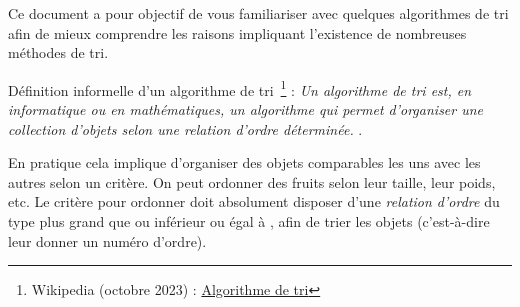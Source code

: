 \documentclass[11pt,a4paper]{article}
\begin{document}
\EncadreTitre

\bigskip


%
%

\bigskip


Ce document a pour objectif de vous familiariser avec quelques algorithmes de tri afin de mieux comprendre les raisons impliquant l'existence de nombreuses méthodes de tri.

\bigskip

Définition informelle d'un algorithme de tri~\footnote{Wikipedia (octobre 2023) : \href{https://fr.wikipedia.org/wiki/Algorithme_de_tri}{Algorithme de tri}} : \og \textit{Un algorithme de tri est, en informatique ou en mathématiques, un algorithme qui permet d'organiser une collection d'objets selon une relation d'ordre déterminée.} \fg .

\bigskip

En pratique cela implique d'organiser des objets comparables les uns avec les autres selon un critère.
On peut ordonner des fruits selon leur taille, leur poids, etc.
Le critère pour ordonner doit absolument disposer d'une \textit{relation d'ordre} du type \og plus grand que \fg{} ou \og inférieur ou égal à \fg{}, afin de trier les objets (c'est-à-dire leur donner un numéro d'ordre).

\bigskip
\end{document}
